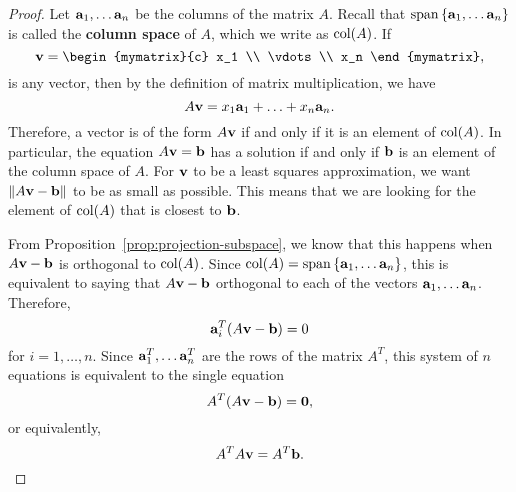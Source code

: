 \begin{proof}
  Let $\vect{a}_1,\ldots\vect{a}_n$ be the columns of the matrix
  $A$. Recall that $\sspan\set{\vect{a}_1,\ldots\vect{a}_n}$ is called
  the \textbf{column space}%
   of $A$, which we write as $\col(A)$.  If
  \begin{equation*}
    \vect{v} = \begin{mymatrix}{c} x_1 \\ \vdots \\ x_n \end{mymatrix},
  \end{equation*}
  is any vector, then by the definition of matrix multiplication, we
  have
  \begin{equation*}
    A\vect{v} = x_1\vect{a}_1 + \ldots + x_n\vect{a}_n.
  \end{equation*}
  Therefore, a vector is of the form $A\vect{v}$ if and only if it is
  an element of $\col(A)$. In particular, the equation
  $A\vect{v}=\vect{b}$ has a solution if and only if $\vect{b}$ is an
  element of the column space of $A$. For $\vect{v}$ to be a least
  squares approximation, we want $\norm{A\vect{v}-\vect{b}}$ to be as
  small as possible. This means that we are looking for the element of
  $\col(A)$ that is closest to $\vect{b}$.
  \begin{center}
  \end{center}
  From Proposition~\ref{prop:projection-subspace}, we know that this
  happens when $A\vect{v}-\vect{b}$ is orthogonal to $\col(A)$. Since
  $\col(A)=\sspan\set{\vect{a}_1,\ldots\vect{a}_n}$, this is
  equivalent to saying that $A\vect{v}-\vect{b}$ orthogonal to each of
  the vectors $\vect{a}_1,\ldots\vect{a}_n$. Therefore,
  \begin{equation*}
    \vect{a}_i^T(A\vect{v}-\vect{b})=0
  \end{equation*}
  for $i=1,\ldots,n$. Since $\vect{a}_1^T,\ldots\vect{a}_n^T$ are the
  rows of the matrix $A^T$, this system of $n$ equations is equivalent
  to the single equation
  \begin{equation*}
    A^T(A\vect{v}-\vect{b})=\vect{0},
  \end{equation*}
  or equivalently,
  \begin{equation*}
    A^TA\vect{v} = A^T\vect{b}.
  \end{equation*}
\end{proof}


